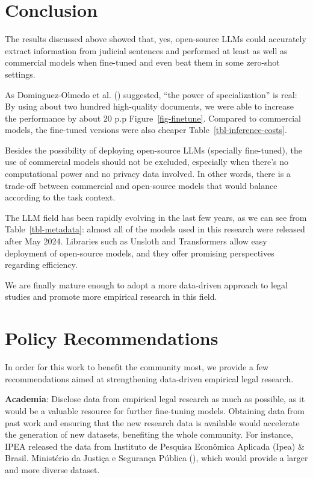 \documentclass[
  12pt,
]{article}
\begin{document}
\section{Conclusion}\label{sec-conclusion}

The results discussed above showed that, yes, open-source LLMs could
accurately extract information from judicial sentences and performed at
least as well as commercial models when fine-tuned and even beat them in
some zero-shot settings.

As Dominguez-Olmedo et al.
() suggested, ``the
power of specialization'' is real: By using about two hundred
high-quality documents, we were able to increase the performance by
about 20 p.p Figure~\ref{fig-finetune}. Compared to commercial models,
the fine-tuned versions were also cheaper
Table~\ref{tbl-inference-costs}.

Besides the possibility of deploying open-source LLMs (specially
fine-tuned), the use of commercial models should not be excluded,
especially when there's no computational power and no privacy data
involved. In other words, there is a trade-off between commercial and
open-source models that would balance according to the task context.

The LLM field has been rapidly evolving in the last few years, as we can
see from Table~\ref{tbl-metadata}: almost all of the models used in this
research were released after May 2024. Libraries such as Unsloth and
Transformers allow easy deployment of open-source models, and they offer
promising perspectives regarding efficiency.

We are finally mature enough to adopt a more data-driven approach to
legal studies and promote more empirical research in this field.

\section{Policy Recommendations}\label{sec-policy-recommendations}

In order for this work to benefit the community most, we provide a few
recommendations aimed at strengthening data-driven empirical legal
research.

\textbf{Academia}: Disclose data from empirical legal research as much
as possible, as it would be a valuable resource for further fine-tuning
models. Obtaining data from past work and ensuring that the new research
data is available would accelerate the generation of new datasets,
benefiting the whole community. For instance, IPEA released the data
from Instituto de Pesquisa Econômica Aplicada (Ipea) \& Brasil.
Ministério da Justiça e Segurança Pública
(),
which would provide a larger and more diverse dataset.
\end{document}
